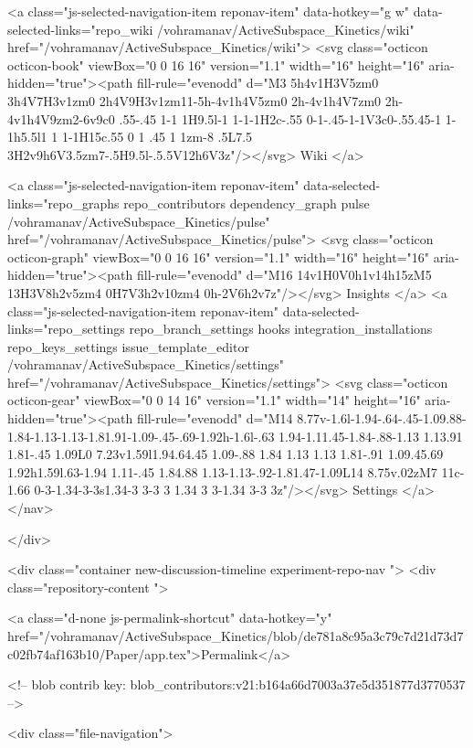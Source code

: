     <a class="js-selected-navigation-item reponav-item" data-hotkey="g w" data-selected-links="repo_wiki /vohramanav/ActiveSubspace_Kinetics/wiki" href="/vohramanav/ActiveSubspace_Kinetics/wiki">
      <svg class="octicon octicon-book" viewBox="0 0 16 16" version="1.1" width="16" height="16" aria-hidden="true"><path fill-rule="evenodd" d="M3 5h4v1H3V5zm0 3h4V7H3v1zm0 2h4V9H3v1zm11-5h-4v1h4V5zm0 2h-4v1h4V7zm0 2h-4v1h4V9zm2-6v9c0 .55-.45 1-1 1H9.5l-1 1-1-1H2c-.55 0-1-.45-1-1V3c0-.55.45-1 1-1h5.5l1 1 1-1H15c.55 0 1 .45 1 1zm-8 .5L7.5 3H2v9h6V3.5zm7-.5H9.5l-.5.5V12h6V3z"/></svg>
      Wiki
</a>

  <a class="js-selected-navigation-item reponav-item" data-selected-links="repo_graphs repo_contributors dependency_graph pulse /vohramanav/ActiveSubspace_Kinetics/pulse" href="/vohramanav/ActiveSubspace_Kinetics/pulse">
    <svg class="octicon octicon-graph" viewBox="0 0 16 16" version="1.1" width="16" height="16" aria-hidden="true"><path fill-rule="evenodd" d="M16 14v1H0V0h1v14h15zM5 13H3V8h2v5zm4 0H7V3h2v10zm4 0h-2V6h2v7z"/></svg>
    Insights
</a>
    <a class="js-selected-navigation-item reponav-item" data-selected-links="repo_settings repo_branch_settings hooks integration_installations repo_keys_settings issue_template_editor /vohramanav/ActiveSubspace_Kinetics/settings" href="/vohramanav/ActiveSubspace_Kinetics/settings">
      <svg class="octicon octicon-gear" viewBox="0 0 14 16" version="1.1" width="14" height="16" aria-hidden="true"><path fill-rule="evenodd" d="M14 8.77v-1.6l-1.94-.64-.45-1.09.88-1.84-1.13-1.13-1.81.91-1.09-.45-.69-1.92h-1.6l-.63 1.94-1.11.45-1.84-.88-1.13 1.13.91 1.81-.45 1.09L0 7.23v1.59l1.94.64.45 1.09-.88 1.84 1.13 1.13 1.81-.91 1.09.45.69 1.92h1.59l.63-1.94 1.11-.45 1.84.88 1.13-1.13-.92-1.81.47-1.09L14 8.75v.02zM7 11c-1.66 0-3-1.34-3-3s1.34-3 3-3 3 1.34 3 3-1.34 3-3 3z"/></svg>
      Settings
</a>
</nav>


  </div>

<div class="container new-discussion-timeline experiment-repo-nav  ">
  <div class="repository-content ">

    
  <a class="d-none js-permalink-shortcut" data-hotkey="y" href="/vohramanav/ActiveSubspace_Kinetics/blob/de781a8c95a3c79c7d21d73d7c02fb74af163b10/Paper/app.tex">Permalink</a>

  <!-- blob contrib key: blob_contributors:v21:b164a66d7003a37e5d351877d3770537 -->

  

  <div class="file-navigation">
    
